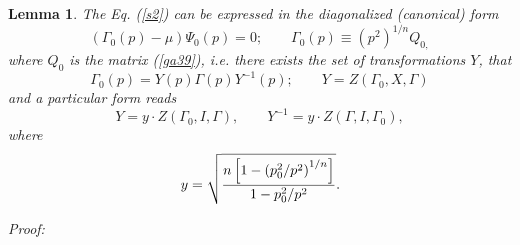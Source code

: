 \documentclass[a4paper,a4paper]{article}
\newtheorem{lemma}[theorem]{Lemma}
\begin{document}
\begin{lemma}
\label{le4} The Eq. (\ref{s2}) can be expressed in the diagonalized
(canonical) form 
\begin{equation}
\left( \Gamma _{0}(p)-\mu \right) \Psi _{0}(p)=0;\mathbf{\qquad }\Gamma
_{0}(p)\equiv \left( p^{2}\right) ^{1/n}Q_{0,}  \label{s26}
\end{equation}%
where $Q_{0}$ is the matrix (\ref{ga39}), i.e. there exists the set of
transformations $Y$, that 
\begin{equation}
\Gamma _{0}(p)=Y(p)\Gamma (p)Y^{-1}(p);\qquad Y=Z(\Gamma _{0},X,\Gamma )
\label{s27}
\end{equation}%
and a particular form reads 
\begin{equation}
Y=y\cdot Z(\Gamma _{0},I,\Gamma ),\mathbf{\qquad }Y^{-1}=y\cdot Z(\Gamma
,I,\Gamma _{0}),  \label{sa27}
\end{equation}%
where%
\begin{equation*}
y=\sqrt{\frac{n\left[ 1-\left( p_{0}^{2}/p^{2}\right) ^{1/n}\right] }{%
1-p_{0}^{2}/p^{2}}}.
\end{equation*}
\end{lemma}

\noindent \textit{Proof:}
\end{document}
